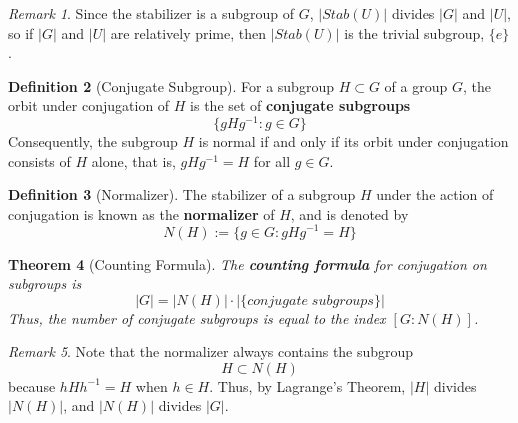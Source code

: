 \documentclass[12pt]{article}
\newtheorem{thm}{Theorem}[section]
\theoremstyle{definition}
\newtheorem{defn}[thm]{Definition}
\theoremstyle{remark}
\newtheorem{rmk}[thm]{Remark}
\numberwithin{equation}{section}
\newcommand\B[1]{\textbf{ #1}}
\begin{document}
\vspace{15pt}

\begin{rmk}
        Since the stabilizer is a subgroup of $G$, $|Stab(U)|$ divides $|G|$ and $|U|$, so if $|G|$ and $|U|$ are relatively prime, then $|Stab(U)|$ is the trivial subgroup, $\{e\}$.
\end{rmk}

\vspace{15pt}


\begin{defn}[Conjugate Subgroup]
        For a subgroup $H \subset G$ of a group $G$, the orbit under conjugation of $H$ is the set of \B{conjugate subgroups}\begin{equation}
                \{gHg^{-1}: g \in G\}
        \end{equation}
        Consequently, the subgroup $H$ is normal if and only if its orbit under conjugation consists of $H$ alone, that is, $gHg^{-1} = H$ for all $g \in G$.
\end{defn}

\vspace{15pt}

\begin{defn}[Normalizer]
        The stabilizer of a subgroup $H$ under the action of conjugation is known as the \B{normalizer} of $H$, and is denoted by \begin{equation}
                N(H) := \{g \in G: gHg^{-1} = H\}
        \end{equation}
\end{defn}


\vspace{15pt}


\begin{thm}[Counting Formula]
        The \B{counting formula} for conjugation on subgroups is \begin{equation}
                |G| = |N(H)|\cdot|\{conjugate\;subgroups\}|
        \end{equation}
        Thus, the number of conjugate subgroups is equal to the index $[G:N(H)]$.
\end{thm}


\vspace{15pt}

\begin{rmk}
        Note that the normalizer always contains the subgroup \begin{equation}
                H \subset N(H) 
        \end{equation}
        because $hHh^{-1} = H$ when $h \in H$. Thus, by Lagrange's Theorem, $|H|$ divides $|N(H)|$, and $|N(H)|$ divides $|G|$.
\end{rmk}
\end{document}
